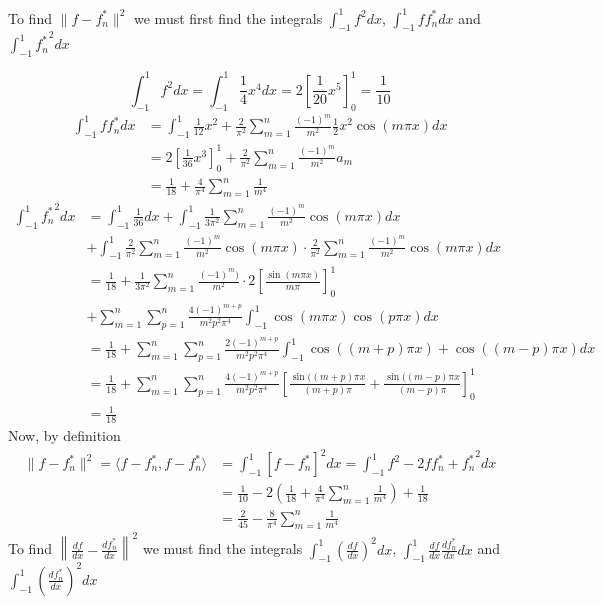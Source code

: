 \documentclass[12pt]{article}
\begin{document}
\section{}

To find $\|f-f_n^*\|^2$ we must first find the integrals $\int_{-1}^1f^2dx$, $\int_{-1}^1ff_n^*dx$ and $\int_{-1}^1{f_n^*}^2dx$

$$
\int_{-1}^1f^2dx = \int_{-1}^1\frac{1}{4}x^4dx = 2\left[\frac{1}{20}x^5\right]_0^1
= \frac{1}{10}
$$
\begin{align*}
\int_{-1}^1ff_n^*dx &=
\int_{-1}^1\frac{1}{12}x^2 + \frac{2}{\pi^2}\sum_{m=1}^n\frac{(-1)^m}{m^2}\frac{1}{2}x^2\cos(m\pi x)dx
\\&= 
2\left[\frac{1}{36}x^3\right]_0^1 + 
\frac{2}{\pi^2}\sum_{m=1}^n\frac{(-1)^m}{m^2}a_m
\\&=
\frac{1}{18} + \frac{4}{\pi^4}\sum_{m=1}^n\frac{1}{m^4}
\end{align*}
\begin{align*}
\int_{-1}^1{f_n^*}^2dx &=
\int_{-1}^1\frac{1}{36}dx + 
\int_{-1}^1\frac{1}{3\pi^2}\sum_{m=1}^n\frac{(-1)^m}{m^2}\cos(m\pi x)dx
\\&+
\int_{-1}^1\frac{2}{\pi^2}\sum_{m=1}^n\frac{(-1)^m}{m^2}\cos(m\pi x)\cdot
\frac{2}{\pi^2}\sum_{m=1}^n\frac{(-1)^m}{m^2}\cos(m\pi x)dx
\\&=
\frac{1}{18} + \frac{1}{3\pi^2}\sum_{m=1}^n\frac{(-1)^m)}{m^2}\cdot
2\left[\frac{\sin(m\pi x)}{m\pi}\right]_0^1 \\&+
\sum_{m=1}^n\sum_{p=1}^n\frac{4(-1)^{m+p}}{m^2p^2\pi^4}
\int_{-1}^1\cos(m\pi x)\cos(p\pi x)dx
\\&=
\frac{1}{18} + 
\sum_{m=1}^n\sum_{p=1}^n\frac{2(-1)^{m+p}}{m^2p^2\pi^4}\int_{-1}^1
\cos\left((m+p)\pi x\right) + \cos\left((m-p)\pi x\right)dx
\\&=
\frac{1}{18} + 
\sum_{m=1}^n\sum_{p=1}^n\frac{4(-1)^{m+p}}{m^2p^2\pi^4}
\left[
\frac{\sin((m+p)\pi x}{(m+p)\pi} + \frac{\sin((m-p)\pi x}{(m-p)\pi}
\right]_0^1
\\&=\frac{1}{18}
\end{align*}
Now, by definition
\begin{align*}
\|f-f_n^*\|^2=\langle f-f_n^*,f-f_n^*\rangle &=
\int_{-1}^1[f-f_n^*]^2dx = \int_{-1}^1 f^2 - 2ff_n^* + {f_n^*}^2dx \\&=
\frac{1}{10} -
2\left(\frac{1}{18} + \frac{4}{\pi^4}\sum_{m=1}^n\frac{1}{m^4}\right) + 
\frac{1}{18} \\&=
\frac{2}{45} - \frac{8}{\pi^4}\sum_{m=1}^n\frac{1}{m^4}
\end{align*}
To find $\left\|\frac{df}{dx}-\frac{df_n^*}{dx}\right\|^2$
we must find the integrals $\int_{-1}^1(\frac{df}{dx})^2dx$,
$\int_{-1}^1\frac{df}{dx}\frac{df_n^*}{dx}dx$
and $\int_{-1}^1\left(\frac{df_n^*}{dx}\right)^2dx$
\end{document}
